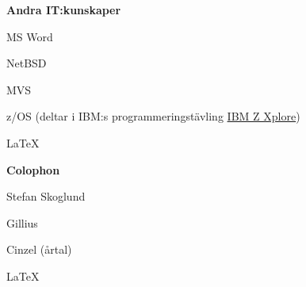\documentclass[a4paper,swedish,10pt]{article}
\begin{document}
\begin{minipage}[t]{0.24\textwidth}
  \textbf{Andra IT:kunskaper}
  \begin{description}[nosep,itemsep=0.1ex]
  \item MS Word
  \item NetBSD
  \item MVS
  \item z/OS (deltar i IBM:s programmeringstävling \href{https://ibmzxplore.influitive.com/forum/}{IBM Z Xplore})
  \item \LaTeX
  \end{description}

  \vspace{20cm}
  \textbf{Colophon}
  \begin{description}[nosep,itemsep=0.1ex]
    \setlength\itemsep{0.1ex}\small%
  \item Stefan Skoglund {}
  \item Gillius
  \item Cinzel (årtal)
  \item \LaTeX%
  \end{description}%
\end{minipage}%
\end{document}
